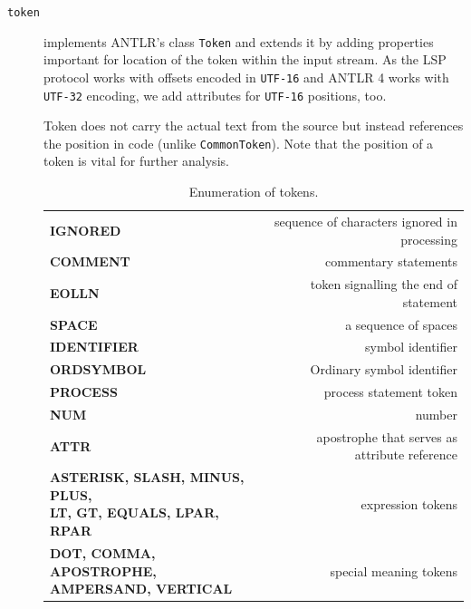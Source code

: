\begin{description}
	
	\item[\texttt{token}] implements ANTLR's class \texttt{Token} and extends it by adding properties important for location of the token within the input stream. As the LSP protocol works with offsets encoded in \texttt{UTF-16} and ANTLR 4 works with \texttt{UTF-32} encoding, we add attributes for \texttt{UTF-16} positions, too.
	
	Token does not carry the actual text from the source but instead references the position in code (unlike \texttt{CommonToken}). Note that the position of a token is vital for further analysis.
	
	\begin{table}
		\centering
		\begin{tabular}{lr}
			\toprule
			\textbf{IGNORED}                                                                     &  sequence of characters ignored in processing \\
			\textbf{COMMENT}                                                                     &                         commentary statements \\
			\textbf{EOLLN}                                                                       &         token signalling the end of statement \\
			\textbf{SPACE}                                                                       &                          a sequence of spaces \\
			\textbf{IDENTIFIER}                                                                  &                             symbol identifier \\
			\textbf{ORDSYMBOL}                                                                   &                    Ordinary symbol identifier \\
			\textbf{PROCESS}                                                                     &                       process statement token \\
			\textbf{NUM}                                                                         &                                        number \\
			\textbf{ATTR}                                                                        & apostrophe that serves as attribute reference \\
			\thead{\textbf{ASTERISK, SLASH, MINUS, PLUS,}\\ \textbf{LT, GT, EQUALS, LPAR, RPAR}} &                             expression tokens \\
			\thead{\textbf{DOT, COMMA, APOSTROPHE,}\\ \textbf{AMPERSAND, VERTICAL}}              &                        special meaning tokens \\ \bottomrule
		\end{tabular}
		\caption{Enumeration of tokens.}
		\label{tab06:tokens}
	\end{table}
	

\end{description}
